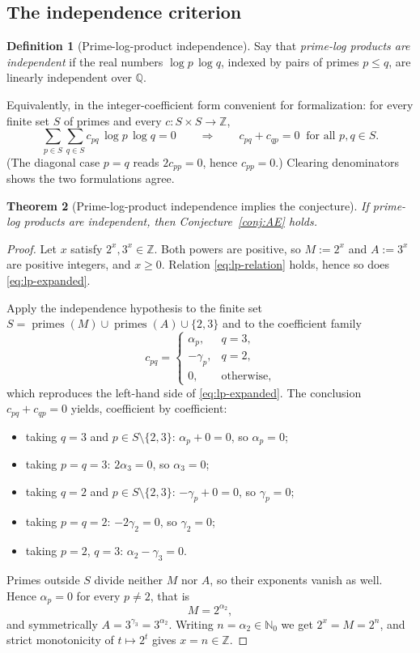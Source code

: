 \documentclass[11pt,oneside]{article}
\newtheorem{theorem}{Theorem}[section]
\theoremstyle{definition}
\newtheorem{definition}[theorem]{Definition}
\theoremstyle{remark}
\newcommand{\Nzero}{\mathbb N_0}
\newcommand{\Z}{\mathbb Z}
\newcommand{\Q}{\mathbb Q}
\begin{document}
\subsection{The independence criterion}

\begin{definition}[Prime-log-product independence]
\label{lp:def-independence}
Say that \emph{prime-log products are independent} if the real numbers
$\log p\,\log q$, indexed by pairs of primes $p\le q$, are linearly independent over $\Q$.
\end{definition}

Equivalently, in the integer-coefficient form convenient for formalization: for every finite
set $S$ of primes and every $c:S\times S\to\Z$,
\[
  \sum_{p\in S}\sum_{q\in S}c_{pq}\,\log p\,\log q=0
  \qquad\Longrightarrow\qquad
  c_{pq}+c_{qp}=0\ \text{ for all }p,q\in S .
\]
(The diagonal case $p=q$ reads $2c_{pp}=0$, hence $c_{pp}=0$.)  Clearing denominators shows
the two formulations agree.

\begin{theorem}[Prime-log-product independence implies the conjecture]
\label{lp:thm-main}
If prime-log products are independent, then Conjecture~\ref{conj:AE} holds.
\end{theorem}

\begin{proof}
Let $x$ satisfy $2^x,3^x\in\Z$.  Both powers are positive, so $M:=2^x$ and $A:=3^x$ are
positive integers, and $x\ge0$.  Relation \eqref{eq:lp-relation} holds, hence so does
\eqref{eq:lp-expanded}.

Apply the independence hypothesis to the finite set
$S=\operatorname{primes}(M)\cup\operatorname{primes}(A)\cup\{2,3\}$ and to the coefficient
family
\[
 c_{pq}
 =\begin{cases}
   \alpha_p, & q=3,\\
   -\gamma_p, & q=2,\\
   0, & \text{otherwise,}
  \end{cases}
\]
which reproduces the left-hand side of \eqref{eq:lp-expanded}.  The conclusion
$c_{pq}+c_{qp}=0$ yields, coefficient by coefficient:
\begin{itemize}
\item taking $q=3$ and $p\in S\setminus\{2,3\}$: $\alpha_p+0=0$, so $\alpha_p=0$;
\item taking $p=q=3$: $2\alpha_3=0$, so $\alpha_3=0$;
\item taking $q=2$ and $p\in S\setminus\{2,3\}$: $-\gamma_p+0=0$, so $\gamma_p=0$;
\item taking $p=q=2$: $-2\gamma_2=0$, so $\gamma_2=0$;
\item taking $p=2$, $q=3$: $\alpha_2-\gamma_3=0$.
\end{itemize}
Primes outside $S$ divide neither $M$ nor $A$, so their exponents vanish as well.  Hence
$\alpha_p=0$ for every $p\neq2$, that is
\[
  M=2^{\alpha_2},
\]
and symmetrically $A=3^{\gamma_3}=3^{\alpha_2}$.  Writing $n=\alpha_2\in\Nzero$ we get
$2^x=M=2^n$, and strict monotonicity of $t\mapsto2^t$ gives $x=n\in\Z$.
\end{proof}
\end{document}
